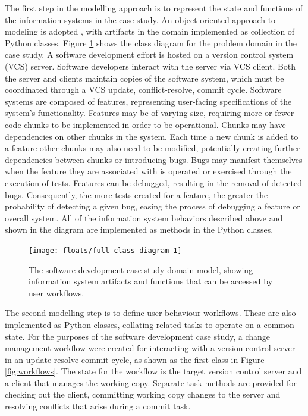 \documentclass{llncs}
\begin{document}
The first step in the modelling approach is to represent the state and functions of the information systems in the case
study. An object oriented approach to modeling is adopted \cite{bennett06object}, with artifacts in the domain
implemented as collection of Python classes.  Figure \ref{fig:domain} shows the class diagram for the problem domain in
the case study.  A software development effort is hosted on a version control system (VCS) server.  Software developers
interact with the server via VCS client.  Both the server and clients maintain copies of the software system, which must
be coordinated through a VCS update, conflict-resolve, commit cycle.  Software systems are composed of features,
representing user-facing specifications of the system's functionality.  Features may be of varying size, requiring more
or fewer code chunks to be implemented in order to be operational.  Chunks may have dependencies on other chunks in the
system.  Each time a new chunk is added to a feature other chunks may also need to be modified, potentially creating
further dependencies between chunks or introducing bugs.  Bugs may manifest themselves when the feature they are
associated with is operated or exercised through the execution of tests.  Features can be debugged, resulting in the
removal of detected bugs.  Consequently, the more tests created for a feature, the greater the probability of detecting
a given bug, easing the process of debugging a feature or overall system. All of the information system behaviors
described above and shown in the diagram are implemented as methods in the Python classes.

\begin{figure}[t]
  \centering
  \texttt{[image: floats/full-class-diagram-1]}
  \caption{The software development case study domain model, showing information system artifacts and functions that can
    be accessed by user workflows.}
  \label{fig:domain}

\end{figure}


The second modelling step is to define user behaviour workflows. These are also implemented as Python classes, collating
related tasks to operate on a common state. For the purposes of the software development case study, a change management
workflow were created for interacting with a version control server in an update-resolve-commit cycle, as shown as the
first class in Figure \ref{fig:workflows}.  The state for the workflow is the target version control server and a client
that manages the working copy.  Separate task methods are provided for checking out the client, committing working copy
changes to the server and resolving conflicts that arise during a commit task.
\end{document}
